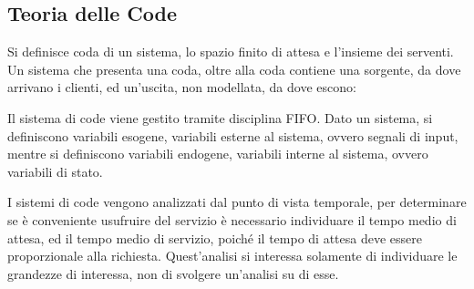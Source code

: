 \documentclass{article}
\numberwithin{equation}{subsection}
\begin{document}
\subsection{Teoria delle Code}

Si definisce coda di un sistema, lo spazio finito di attesa e l'insieme dei serventi. Un sistema che presenta una coda, oltre alla coda contiene una sorgente, da dove 
arrivano i clienti, ed un'uscita, non modellata, da dove escono:
\begin{center}
\end{center} 

Il sistema di code viene gestito tramite disciplina FIFO. Dato un sistema, si definiscono variabili esogene, variabili esterne al sistema, ovvero segnali di input, mentre 
si definiscono variabili endogene, variabili interne al sistema, ovvero variabili di stato. 

I sistemi di code vengono analizzati dal punto di vista temporale, per determinare se è conveniente usufruire del servizio è necessario individuare il tempo medio di attesa, 
ed il tempo medio di servizio, poiché il tempo di attesa deve essere proporzionale alla richiesta. Quest'analisi si interessa solamente di individuare le grandezze di 
interessa, non di svolgere un'analisi su di esse. 
\end{document}
